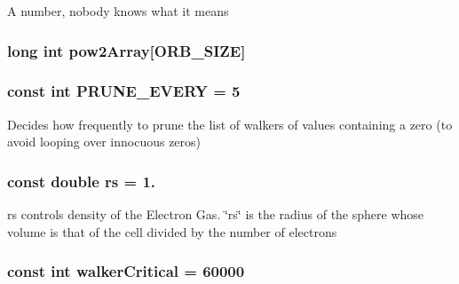 A number, nobody knows what it means \hypertarget{UEG__MAIN__binarytest_8C_a5a4a522e121fab9651a940cabf5ac77d}{
\subsubsection[{pow2\-Array}]{\setlength{\rightskip}{0pt plus 5cm}long int pow2\-Array\mbox{[}O\-R\-B\-\_\-\-S\-I\-Z\-E\mbox{]}}}\label{UEG__MAIN__binarytest_8C_a5a4a522e121fab9651a940cabf5ac77d}
\hypertarget{UEG__MAIN__binarytest_8C_aecb8ec6a7a5a3e737bef25336ec80927}{
\subsubsection[{P\-R\-U\-N\-E\-\_\-\-E\-V\-E\-R\-Y}]{\setlength{\rightskip}{0pt plus 5cm}const int P\-R\-U\-N\-E\-\_\-\-E\-V\-E\-R\-Y = 5}}\label{UEG__MAIN__binarytest_8C_aecb8ec6a7a5a3e737bef25336ec80927}
Decides how frequently to prune the list of walkers of values containing a zero (to avoid looping over innocuous zeros) \hypertarget{UEG__MAIN__binarytest_8C_a363ad74e3d4570cd6bfaa4622e0af0bd}{
\subsubsection[{rs}]{\setlength{\rightskip}{0pt plus 5cm}const double rs = 1.}}\label{UEG__MAIN__binarytest_8C_a363ad74e3d4570cd6bfaa4622e0af0bd}
rs controls density of the Electron Gas. \char`\"{}rs\char`\"{} is the radius of the sphere whose volume is that of the cell divided by the number of electrons \hypertarget{UEG__MAIN__binarytest_8C_a6c7e0fd46bc659f43a5e2fe841b0aeeb}{
\subsubsection[{walker\-Critical}]{\setlength{\rightskip}{0pt plus 5cm}const int walker\-Critical = 60000}}\label{UEG__MAIN__binarytest_8C_a6c7e0fd46bc659f43a5e2fe841b0aeeb}
